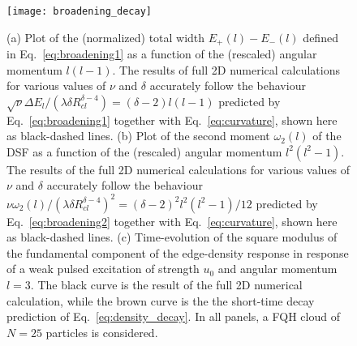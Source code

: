 \documentclass[twocolumn,pra,superscriptaddress,noshowpacs]{revtex4}
\begin{document}





\begin{figure}[htbp]
   	\begin{adjustbox}{width=.5\textwidth, totalheight=\baselineskip,keepaspectratio,right}
      	\texttt{[image: broadening\_decay]}
    \end{adjustbox}
    \vspace{0.0cm}\caption{(a) Plot of the (normalized) total width $E_+(l)-E_-(l)$ defined in Eq.~\eqref{eq:broadening1} as a function of the (rescaled) angular momentum $l(l-1)$. 
    The results of full 2D numerical calculations for various values of $\nu$ and $\delta$ accurately follow the behaviour $\sqrt{\nu}\Delta E_l/(\lambda \delta R_{cl}^{\delta-4})=(\delta-2)l(l-1)$ predicted by Eq.~\eqref{eq:broadening1} together with Eq.~\eqref{eq:curvature}, shown here as black-dashed lines.
    (b) Plot of the second moment $\omega_2(l)$ of the DSF as a function of the (rescaled) angular momentum $l^2(l^2-1)$. 
    The results of the full 2D numerical calculations for various values of $\nu$ and $\delta$ accurately follow the behaviour $\nu\omega_2(l) / (\lambda\delta R_{cl}^{\delta-4})^2 = (\delta-2)^2l^2(l^2-1)/12$ predicted by Eq.~\eqref{eq:broadening2} together with Eq.~\eqref{eq:curvature}, shown here as black-dashed lines.
    (c) Time-evolution of the square modulus of the fundamental component of the edge-density response in response of a weak pulsed excitation of strength $u_0$ and angular momentum $l=3$. 
    The black curve is the result of the full 2D numerical calculation, while the brown curve is the the short-time decay prediction of Eq.~\eqref{eq:density_decay}. In all panels, a FQH cloud of $N=25$ particles is considered.    
    \label{fig:broadening_and_decay}}
\end{figure}
\end{document}
